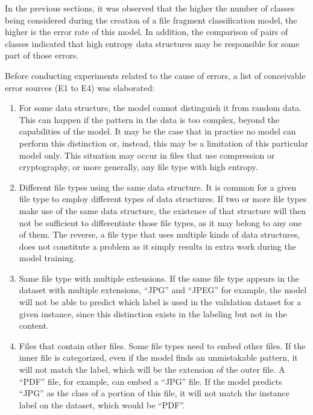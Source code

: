 \label{sec:exprandom}

In the previous sections, it was observed that the higher the number of classes being considered during the creation of a file fragment classification model, the higher is the error rate of this model. In addition, the comparison of pairs of classes indicated that high entropy data structures may be responsible for some part of those errors.

Before conducting experiments related to the cause of errors, a list of conceivable error sources (E1 to E4) was elaborated:
\begin{enumerate}[itemindent=\parindent,label=\textbf{E\arabic*.}]
    \item For some data structure, the model cannot distinguish it from random data. This can happen if the pattern in the data is too complex, beyond the capabilities of the model. It may be the case that in practice no model can perform this distinction or, instead, this may be a limitation of this particular model only. This situation may occur in files that use compression or cryptography, or more generally, any file type with high entropy.

    \item Different file types using the same data structure. It is common for a given file type to employ different types of data structures. If two or more file types make use of the same data structure, the existence of that structure will then not be sufficient to differentiate those file types, as it may belong to any one of them.
    The reverse, a file type that uses multiple kinds of data structures, does not constitute a problem as it simply results in extra work during the model training.

    \item Same file type with multiple extensions. If the same file type appears in the dataset with multiple extensions, ``JPG'' and ``JPEG'' for example, the model will not be able to predict which label is used in the validation dataset for a given instance, since this distinction exists in the labeling but not in the content.

    \item Files that contain other files. Some file types need to embed other files. If the inner file is categorized, even if the model finds an unmistakable pattern, it will not match the label, which will be the extension of the outer file. A ``PDF'' file, for example, can embed a ``JPG'' file. If the model predicts ``JPG'' as the class of a portion of this file, it will not match the instance label on the dataset, which would be ``PDF''.
\end{enumerate}

